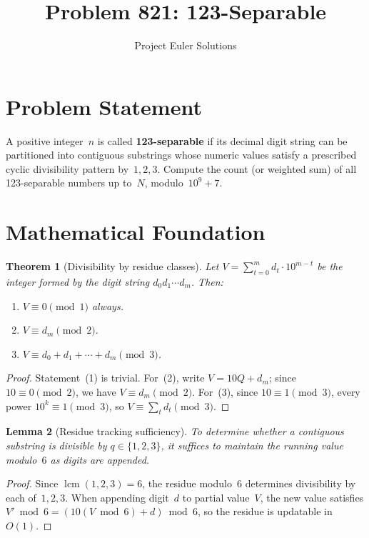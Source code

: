 \documentclass[11pt]{article}
\title{Problem 821: 123-Separable}
\author{Project Euler Solutions}
\date{}
\newtheorem{theorem}{Theorem}
\newtheorem{lemma}[theorem]{Lemma}
\theoremstyle{definition}
\begin{document}
\maketitle

\section{Problem Statement}

A positive integer~$n$ is called \textbf{123-separable} if its decimal digit string can be partitioned into contiguous substrings whose numeric values satisfy a prescribed cyclic divisibility pattern by~$1, 2, 3$. Compute the count (or weighted sum) of all 123-separable numbers up to~$N$, modulo~$10^9+7$.

\section{Mathematical Foundation}

\begin{theorem}[Divisibility by residue classes]
Let $V = \sum_{t=0}^{m} d_t \cdot 10^{m-t}$ be the integer formed by the digit string $d_0 d_1 \cdots d_m$. Then:
\begin{enumerate}
    \item $V \equiv 0 \pmod{1}$ always.
    \item $V \equiv d_m \pmod{2}$.
    \item $V \equiv d_0 + d_1 + \cdots + d_m \pmod{3}$.
\end{enumerate}
\end{theorem}

\begin{proof}
Statement~(1) is trivial. For~(2), write $V = 10Q + d_m$; since $10 \equiv 0 \pmod{2}$, we have $V \equiv d_m \pmod{2}$. For~(3), since $10 \equiv 1 \pmod{3}$, every power $10^k \equiv 1 \pmod{3}$, so $V \equiv \sum_t d_t \pmod{3}$.
\end{proof}

\begin{lemma}[Residue tracking sufficiency]
To determine whether a contiguous substring is divisible by $q \in \{1,2,3\}$, it suffices to maintain the running value modulo~$6$ as digits are appended.
\end{lemma}

\begin{proof}
Since $\operatorname{lcm}(1,2,3) = 6$, the residue modulo~$6$ determines divisibility by each of~$1, 2, 3$. When appending digit~$d$ to partial value~$V$, the new value satisfies $V' \bmod 6 = (10(V \bmod 6) + d) \bmod 6$, so the residue is updatable in~$O(1)$.
\end{proof}
\end{document}
